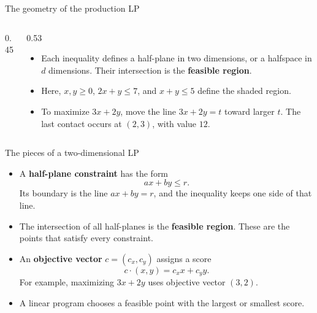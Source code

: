 \documentclass[aspectratio=169]{beamer}
\begin{document}
\begin{frame}{The geometry of the production LP}
\begin{columns}
\begin{column}{0.45\textwidth}
\end{column}
\begin{column}{0.53\textwidth}
\begin{itemize}
\item Each inequality defines a half-plane in two dimensions, or a halfspace in $d$ dimensions. Their intersection is the \textbf{feasible region}.
\pause
\item Here, $x,y\geq0$, $2x+y\leq7$, and $x+y\leq5$ define the shaded region.
\pause
\item To maximize $3x+2y$, move the line $3x+2y=t$ toward larger $t$. The last contact occurs at $(2,3)$, with value $12$.
\end{itemize}
\end{column}
\end{columns}
\end{frame}

\begin{frame}{The pieces of a two-dimensional LP}
\begin{itemize}[<+->]
\item A \textbf{half-plane constraint} has the form
\[
ax+by\leq r.
\]
Its boundary is the line $ax+by=r$, and the inequality keeps one side of that line.
\item The intersection of all half-planes is the \textbf{feasible region}. These are the points that satisfy every constraint.
\item An \textbf{objective vector} $c=(c_x,c_y)$ assigns a score
\[
c\mathbin{\cdot}(x,y)=c_xx+c_yy.
\]
For example, maximizing $3x+2y$ uses objective vector $(3,2)$.
\item A linear program chooses a feasible point with the largest or smallest score.
\end{itemize}
\end{frame}
\end{document}
